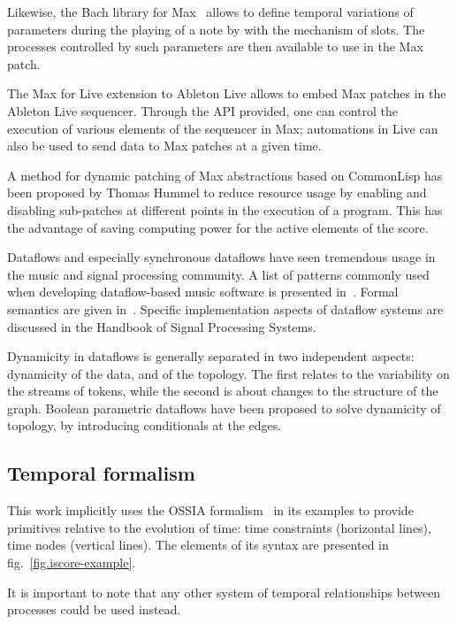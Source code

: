 \documentclass{article}
\begin{document}
Likewise, the Bach library for Max~\cite{agostini2015max} allows to define temporal variations of parameters during the playing of a note by with the mechanism of slots.
The processes controlled by such parameters are then available to use in the Max patch.

The Max for Live extension to Ableton Live allows to embed Max patches in the Ableton Live sequencer. 
Through the API provided, one can control the execution of various elements of the sequencer in Max; automations in Live can also be used to send data to Max patches at a given time.

A method for dynamic patching of Max abstractions based on CommonLisp has been proposed by Thomas Hummel\cite{hummel1994common} to reduce resource usage by enabling and disabling sub-patches at different points in the execution of a program.
This has the advantage of saving computing power for the active elements of the score.

Dataflows and especially synchronous dataflows have seen tremendous usage in the music and signal processing community. 
A list of patterns commonly used when developing dataflow-based music software is presented in~\cite{arumi2006dataflow}.
Formal semantics are given in~\cite{benveniste_data-flow_1993}.
Specific implementation aspects of dataflow systems are discussed in the Handbook of Signal Processing Systems\cite{bhattacharyya_handbook_2013}. 

Dynamicity in dataflows is generally separated in two independent aspects: dynamicity of the data, and of the topology.
The first relates to the variability on the streams of tokens, while the second is about changes to the structure of the graph. 
Boolean parametric dataflows\cite{bempelis2015boolean} have been proposed to solve dynamicity of topology, by introducing conditionals at the edges.

\subsection{Temporal formalism}

This work implicitly uses the OSSIA formalism~\cite{celerier2015ossia} in its examples to provide primitives relative to the evolution of time: time constraints (horizontal lines), time nodes (vertical lines). 
The elements of its syntax are presented in fig.~\ref{fig.iscore-example}.

It is important to note that any other system of temporal relationships between processes could be used instead.
\end{document}
